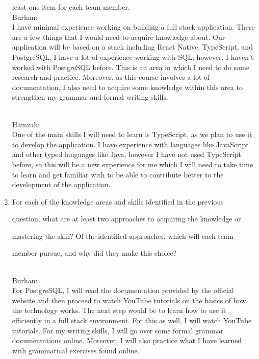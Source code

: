 \documentclass[12pt,letterpaper]{article}
\begin{document}
\begin{enumerate}
  least one item for each team member. \\

 

Burhan: \\

I have minimal experience working on building a full stack application. There are a few things that I would need to acquire knowledge about. Our application will be based on a stack including React Native, TypeScript, and PostgreSQL. I have a lot of experience working with SQL; however, I haven’t worked with PostgreSQL before. This is an area in which I need to do some research and practice. Moreover, as this course involves a lot of documentation, I also need to acquire some knowledge within this area to strengthen my grammar and formal writing skills.  

 \\

Hamzah: \\

One of the main skills I will need to learn is TypeScript, as we plan to use it to develop the application. I have experience with languages like JavaScript and other typed languages like Java, however I have not used TypeScript before, so this will be a new experience for me which I will need to take time to learn and get familiar with to be able to contribute better to the development of the application. 
\\
 

  \item For each of the knowledge areas and skills identified in the previous 

  question, what are at least two approaches to acquiring the knowledge or 

  mastering the skill?  Of the identified approaches, which will each team 

  member pursue, and why did they make this choice? 

 \\

Burhan:  \\

For PostgreSQL, I will read the documentation provided by the official website and then proceed to watch YouTube tutorials on the basics of how the technology works. The next step would be to learn how to use it efficiently in a full stack environment. For this as well, I will watch YouTube tutorials. For my writing skills, I will go over some formal grammar documentations online. Moreover, I will also practice what I have learned with grammatical exercises found online.  
\\
 


\end{enumerate}
\end{document}
